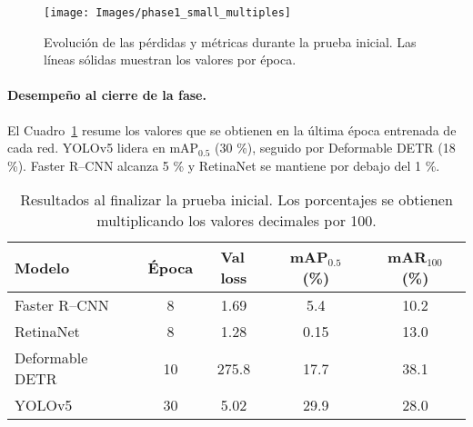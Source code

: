 \begin{figure}[htpb]
  \centering
  \texttt{[image: Images/phase1\_small\_multiples]}
  \caption[Curvas de pérdida y métricas de la Fase 1]{Evolución de las pérdidas y métricas durante la prueba inicial. Las líneas sólidas muestran los valores por época.}
  \label{fig:phase1_small_multiples}
\end{figure}

\paragraph{Desempeño al cierre de la fase.}
El Cuadro~\ref{tab:fase1_final} resume los valores que se obtienen en la última época entrenada de cada red.
YOLOv5 lidera en mAP$_{0.5}$ (30 \%), seguido por Deformable DETR (18 \%).
Faster R–CNN alcanza 5 \% y RetinaNet se mantiene por debajo del 1 \%.

\begin{table}[htpb]
  \centering
  \begin{tabular}{lcccc}
    \hline
    \textbf{Modelo} & \textbf{Época} & \textbf{Val\,loss} & \textbf{mAP$_{0.5}$ (\%)} & \textbf{mAR$_{100}$ (\%)}\\
    \hline
    Faster R–CNN        & 8  & 1.69  & 5.4  & 10.2 \\
    RetinaNet           & 8  & 1.28  & 0.15 & 13.0 \\
    Deformable DETR     & 10 & 275.8 & 17.7 & 38.1 \\
    YOLOv5              & 30 & 5.02  & 29.9 & 28.0 \\
    \hline
  \end{tabular}
  \caption[Resumen cuantitativo de la Fase 1]{Resultados al finalizar la prueba inicial. Los porcentajes se obtienen multiplicando los valores decimales por 100.}
  \label{tab:fase1_final}
\end{table}

